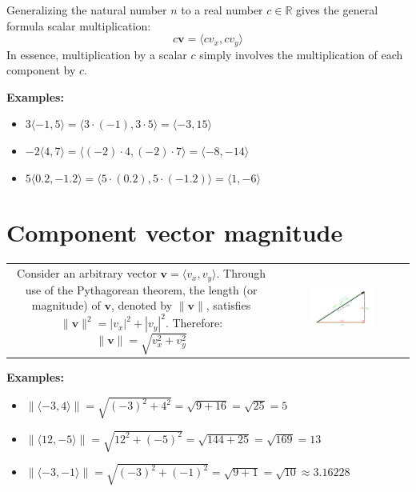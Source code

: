 \documentclass{article}
\begin{document}
Generalizing the natural number \(n\) to a real number \(c \in \mathbb{R}\) gives the general formula scalar multiplication:
\[c\mathbf{v} = \langle c v_x, c v_y \rangle\]
In essence, multiplication by a scalar \(c\) simply involves the multiplication of each component by \(c\).

\textbf{Examples:}
\begin{itemize}
\item \(3\langle -1, 5 \rangle = \langle 3 \cdot (-1), 3 \cdot 5 \rangle = \langle -3, 15 \rangle\)
\item \(-2\langle 4, 7 \rangle = \langle (-2) \cdot 4, (-2) \cdot 7 \rangle = \langle -8, -14 \rangle\)
\item \(5\langle 0.2, -1.2 \rangle = \langle 5 \cdot (0.2), 5 \cdot (-1.2) \rangle = \langle 1, -6 \rangle\)
\end{itemize}


\section*{Component vector magnitude}

\begin{tabular}{cc}
\parbox{0.5\textwidth}{
Consider an arbitrary vector \(\mathbf{v} = \langle v_x, v_y \rangle\). Through use of the Pythagorean theorem, the length (or magnitude) of \(\mathbf{v}\), denoted by \(\|\mathbf{v}\|\), satisfies \(\|\mathbf{v}\|^2 = |v_x|^2 + |v_y|^2\). Therefore:
\[\|\mathbf{v}\| = \sqrt{v_x^2 + v_y^2}\]
} & \parbox{0.5\textwidth}{
\includegraphics[width = 0.5\textwidth]{component_vector_magnitude}
}
\end{tabular}

\textbf{Examples:}
\begin{itemize}
\item \(\|\langle -3, 4 \rangle\| = \sqrt{(-3)^2 + 4^2} = \sqrt{9 + 16} = \sqrt{25} = 5\)
\item \(\|\langle 12, -5 \rangle\| = \sqrt{12^2 + (-5)^2} = \sqrt{144 + 25} = \sqrt{169} = 13\)
\item \(\|\langle -3, -1 \rangle\| = \sqrt{(-3)^2 + (-1)^2} = \sqrt{9 + 1} = \sqrt{10} \approx 3.16228\)
\end{itemize}
\end{document}
